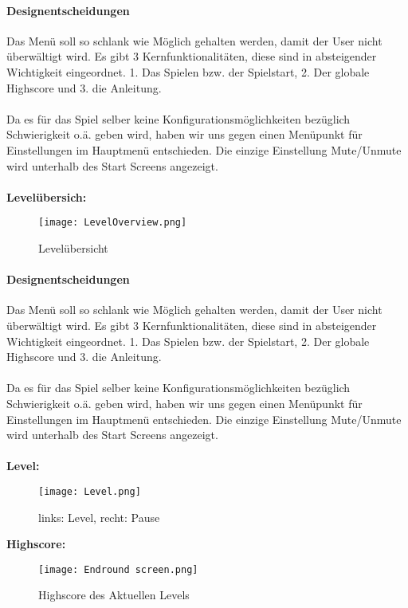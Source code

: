 \documentclass[12pt, a4paper]{article}
\begin{document}
\paragraph{Designentscheidungen}\newline
Das Menü soll so schlank wie Möglich gehalten werden, damit der User nicht überwältigt wird. Es gibt 3 Kernfunktionalitäten, diese sind in absteigender Wichtigkeit eingeordnet. 1. Das Spielen bzw. der Spielstart, 2. Der globale Highscore und 3. die Anleitung.\\\\ Da es für das Spiel selber keine Konfigurationsmöglichkeiten bezüglich Schwierigkeit o.ä. geben wird, haben wir uns gegen einen Menüpunkt für Einstellungen im Hauptmenü entschieden. Die einzige Einstellung Mute/Unmute wird unterhalb des Start Screens angezeigt.\\\\
\newpage
\textbf{Levelübersich:}
\begin{figure}[H]
\centering
\texttt{[image: LevelOverview.png]}
\caption{Levelübersicht}
\end{figure}
\paragraph{Designentscheidungen}\newline
Das Menü soll so schlank wie Möglich gehalten werden, damit der User nicht überwältigt wird. Es gibt 3 Kernfunktionalitäten, diese sind in absteigender Wichtigkeit eingeordnet. 1. Das Spielen bzw. der Spielstart, 2. Der globale Highscore und 3. die Anleitung.\\\\ Da es für das Spiel selber keine Konfigurationsmöglichkeiten bezüglich Schwierigkeit o.ä. geben wird, haben wir uns gegen einen Menüpunkt für Einstellungen im Hauptmenü entschieden. Die einzige Einstellung Mute/Unmute wird unterhalb des Start Screens angezeigt.\\\\
\newpage
\textbf{Level:}
\begin{figure}[H]
\centering
\texttt{[image: Level.png]}
\caption{links: Level, recht: Pause}
\end{figure}
\par\bigskip
\textbf{Highscore:}
\begin{figure}[H]
\centering
\texttt{[image: Endround screen.png]}
\caption{Highscore des Aktuellen Levels}
\end{figure}
\end{document}
